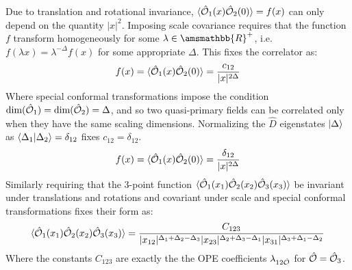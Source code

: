   Due to translation and rotational invariance, $\braket{\hat{\mathcal{{O}}}_1(x)\hat{\mathcal{{O}}}_2(0)} = f(x)$ can only depend on the quantity $|x|^2$. Imposing scale covariance requires that the function $f$ transform homogeneously for some $\lambda \in \amsmathbb{R}^+$, i.e. $f(\lambda x)=\lambda^{-\Delta} f(x)$ for some appropriate $\Delta$. This fixes the correlator as:
  \begin{align}
   f(x) = \braket{\hat{\mathcal{{O}}}_1(x)\hat{\mathcal{{O}}}_2(0)} = \frac{c_{12}}{|x|^{2\Delta}}
  \end{align}
  Where special conformal transformations impose the condition $\text{dim}(\hat{\mathcal{{O}}}_1)=\text{dim}(\hat{\mathcal{{O}}}_2)=\Delta$, and so two quasi-primary fields can be correlated only when they have the same scaling dimensions. Normalizing the $\hat D$ eigenstates $\ket{\Delta}$ as $\braket{\Delta_1|\Delta_2}=\delta_{12}$ fixes $c_{12}=\delta_{12}$.
   \begin{align} \label{ch2:two_point}
   f(x) = \braket{\hat{\mathcal{{O}}}_1(x)\hat{\mathcal{{O}}}_2(0)} = \frac{\delta_{12}}{|x|^{2\Delta}}
  \end{align}
  Similarly requiring that the 3-point function $\braket{\hat{\mathcal{{O}}}_1(x_1) \hat{\mathcal{{O}}}_2(x_2) \hat{\mathcal{{O}}}_3(x_3)}$ be invariant under translations and rotations and covariant under scale and special conformal transformations fixes their form as: 
  \begin{align} \label{ch2:3_point}
   \braket{ \hat{\mathcal{{O}}}_1(x_1) \hat{\mathcal{{O}}}_2(x_2) \hat{\mathcal{{O}}}_3(x_3)} = \frac{C_{123}}{|x_{12}|^{\Delta_1+\Delta_2-\Delta_3}|x_{23}|^{\Delta_2+\Delta_3-\Delta_1}|x_{31}|^{\Delta_3+\Delta_1-\Delta_2}}
  \end{align}
  Where the constants $C_{123}$ are exactly the the OPE coefficients $\lambda_{12\hat{\mathcal{{O}}}}$ for $\hat{\mathcal{{O}}}=\hat{\mathcal{{O}}}_3$.
%   
  
